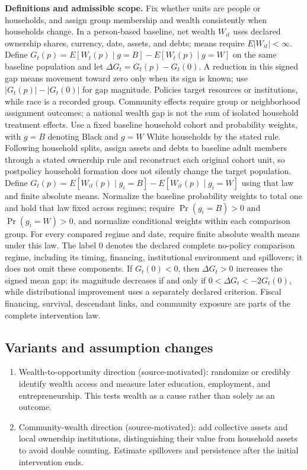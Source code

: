 \documentclass[11pt,a4paper]{article}
\begin{document}
\textbf{Definitions and admissible scope.} Fix whether units are people or households, and assign group membership and wealth consistently when households change. In a person-based baseline, net wealth \(W_{it}\) uses declared ownership shares, currency, date, assets, and debts; means require \(E|W_{it}|<\infty\). Define \(G_t(p)=E[W_t(p)\mid g=B]-E[W_t(p)\mid g=W]\) on the same baseline population and let \(\Delta G_t=G_t(p)-G_t(0)\). A reduction in this signed gap means movement toward zero only when its sign is known; use \(|G_t(p)|-|G_t(0)|\) for gap magnitude. Policies target resources or institutions, while race is a recorded group. Community effects require group or neighborhood assignment outcomes; a national wealth gap is not the sum of isolated household treatment effects. Use a fixed baseline household cohort and probability weights, with \(g=B\) denoting Black and \(g=W\) White households by the stated rule. Following household splits, assign assets and debts to baseline adult members through a stated ownership rule and reconstruct each original cohort unit, so postpolicy household formation does not silently change the target population. Define \(G_t(p)=E[W_{it}(p)\mid g_i=B]-E[W_{it}(p)\mid g_i=W]\) using that law and finite absolute means. Normalize the baseline probability weights to total one and hold that law fixed across regimes; require \(\Pr(g_i=B)>0\) and \(\Pr(g_i=W)>0\), and normalize conditional weights within each comparison group. For every compared regime and date, require finite absolute wealth means under this law. The label \(0\) denotes the declared complete no-policy comparison regime, including its timing, financing, institutional environment and spillovers; it does not omit these components. If \(G_t(0)<0\), then \(\Delta G_t>0\) increases the signed mean gap; its magnitude decreases if and only if \(0<\Delta G_t<-2G_t(0)\), while distributional improvement uses a separately declared criterion. Fiscal financing, survival, descendant links, and community exposure are parts of the complete intervention law.
\subsection*{Variants and assumption changes}
\begin{enumerate}
\item Wealth-to-opportunity direction (source-motivated): randomize or credibly identify wealth access and measure later education, employment, and entrepreneurship. This tests wealth as a cause rather than solely as an outcome.
\item Community-wealth direction (source-motivated): add collective assets and local ownership institutions, distinguishing their value from household assets to avoid double counting. Estimate spillovers and persistence after the initial intervention ends.
\end{enumerate}
\end{document}
